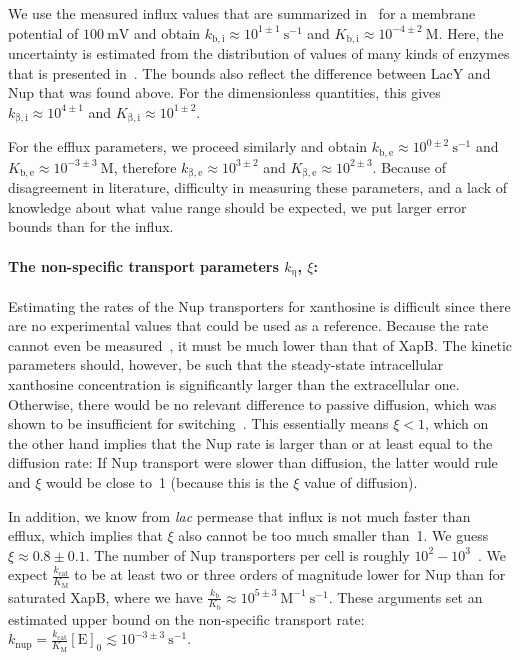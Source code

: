 \documentclass[10pt,letterpaper]{article}
\newcommand{\n}[1]{\mathrm{#1}}
\begin{document}
We use the measured influx values that are summarized in~\cite{Viitanen1984}
for a membrane potential of $100~\n{mV}$ and obtain $k_{\n{b,i}} \approx
10^{1 \pm 1}~\n{s^{-1}}$ and $K_{\n{b,i}} \approx 10^{-4 \pm 2}~\n{M}$.
Here, the uncertainty is estimated from the distribution of values of many
kinds of enzymes that is presented in~\cite{Milo2016}. The bounds also
reflect the difference between LacY and Nup that was found above. For the
dimensionless quantities, this gives $k_{\n{\beta,i}} \approx 10^{4 \pm 1}$
and $K_{\n{\beta,i}} \approx 10^{1 \pm 2}$. 

For the efflux parameters, we proceed similarly and obtain $k_{\n{b,e}}
\approx 10^{0 \pm 2}~\n{s^{-1}}$ and $K_{\n{b,e}} \approx 10^{-3 \pm
3}~\n{M}$, therefore $k_{\n{\beta,e}} \approx 10^{3 \pm 2}$ and
$K_{\n{\beta,e}} \approx 10^{2 \pm 3}$. Because of disagreement in
literature, difficulty in measuring these parameters, and a lack of
knowledge about what value range should be expected, we put larger error
bounds than for the influx. 

\paragraph*{The non-specific transport parameters $k_{\n{\eta}}$, $\xi$:}
Estimating the rates of the Nup transporters for xanthosine is difficult
since there are no experimental values that could be used as a reference.
Because the rate cannot even be measured~\cite{Norholm2001}, it must be much
lower than that of XapB. The kinetic parameters should, however, be such
that the steady-state intracellular xanthosine concentration is
significantly larger than the extracellular one. Otherwise, there would be
no relevant difference to passive diffusion, which was shown to be
insufficient for switching~\cite{Norholm2001}. This essentially means $\xi <
1$, which on the other hand implies that the Nup rate is larger than or at
least equal to the diffusion rate: If Nup transport were slower than
diffusion, the latter would rule and $\xi$ would be close to~1 (because this
is the $\xi$ value of diffusion). 

In addition, we know from \emph{lac} permease that influx is not much faster
than efflux, which implies that $\xi$ also cannot be too much smaller
than~1. We guess $\xi \approx 0.8 \pm 0.1$. The number of Nup transporters
per cell is roughly $10^2-10^3$~\cite{Li2014}. We expect
$\frac{k_{\n{cat}}}{K_{\n{M}}}$ to be at least two or three orders of
magnitude lower for Nup than for saturated XapB, where we have
$\frac{k_{\n{b}}}{K_{\n{b}}} \approx 10^{5 \pm 3}~\n{M^{-1}\ s^{-1}}$. These
arguments set an estimated upper bound on the non-specific transport rate:
$k_{\n{nup}} = \frac{k_{\n{cat}}}{K_{\n{M}}} \n{[E]_0} \lesssim 10^{-3 \pm
3}~\n{s^{-1}}$. 
\end{document}
